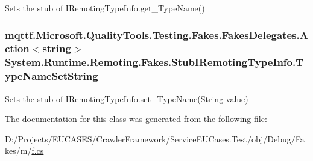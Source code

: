 Sets the stub of I\-Remoting\-Type\-Info.\-get\-\_\-\-Type\-Name()

\hypertarget{class_system_1_1_runtime_1_1_remoting_1_1_fakes_1_1_stub_i_remoting_type_info_ab6f5d4d90caec5b61adbe59b2f784f01}{
\subsubsection[{Type\-Name\-Set\-String}]{\setlength{\rightskip}{0pt plus 5cm}mqttf.\-Microsoft.\-Quality\-Tools.\-Testing.\-Fakes.\-Fakes\-Delegates.\-Action$<$string$>$ System.\-Runtime.\-Remoting.\-Fakes.\-Stub\-I\-Remoting\-Type\-Info.\-Type\-Name\-Set\-String}}\label{class_system_1_1_runtime_1_1_remoting_1_1_fakes_1_1_stub_i_remoting_type_info_ab6f5d4d90caec5b61adbe59b2f784f01}


Sets the stub of I\-Remoting\-Type\-Info.\-set\-\_\-\-Type\-Name(\-String value)



The documentation for this class was generated from the following file\-:\begin{DoxyCompactItemize}
\item 
D\-:/\-Projects/\-E\-U\-C\-A\-S\-E\-S/\-Crawler\-Framework/\-Service\-E\-U\-Cases.\-Test/obj/\-Debug/\-Fakes/m/\hyperlink{m_2f_8cs}{f.\-cs}\end{DoxyCompactItemize}
